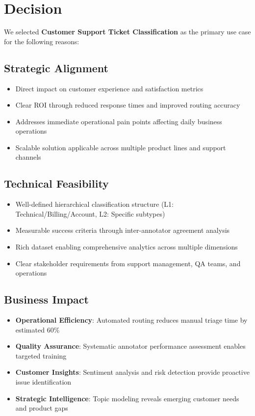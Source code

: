 \documentclass[11pt]{article}
\begin{document}
\section{Decision}

We selected \textbf{Customer Support Ticket Classification} as the primary use case for the following reasons:

\subsection{Strategic Alignment}
\begin{itemize}
\item Direct impact on customer experience and satisfaction metrics
\item Clear ROI through reduced response times and improved routing accuracy
\item Addresses immediate operational pain points affecting daily business operations
\item Scalable solution applicable across multiple product lines and support channels
\end{itemize}

\subsection{Technical Feasibility}
\begin{itemize}
\item Well-defined hierarchical classification structure (L1: Technical/Billing/Account, L2: Specific subtypes)
\item Measurable success criteria through inter-annotator agreement analysis
\item Rich dataset enabling comprehensive analytics across multiple dimensions
\item Clear stakeholder requirements from support management, QA teams, and operations
\end{itemize}

\subsection{Business Impact}
\begin{itemize}
\item \textbf{Operational Efficiency}: Automated routing reduces manual triage time by estimated 60\%
\item \textbf{Quality Assurance}: Systematic annotator performance assessment enables targeted training
\item \textbf{Customer Insights}: Sentiment analysis and risk detection provide proactive issue identification
\item \textbf{Strategic Intelligence}: Topic modeling reveals emerging customer needs and product gaps
\end{itemize}
\end{document}
